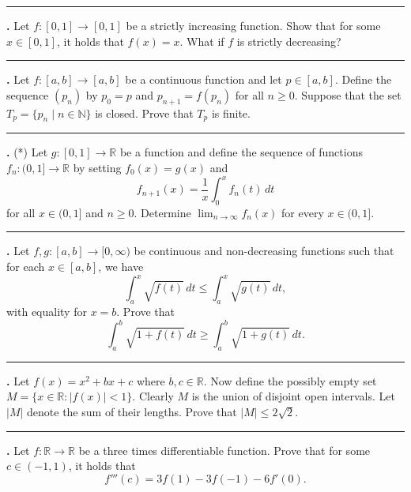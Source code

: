 \documentclass[11pt]{article}
\newcounter{probnum}
\newenvironment{problembox}{\par\noindent\rule{\linewidth}{0.5pt}\vspace{5pt}\par}{\vspace{2pt}}
\begin{document}
\begin{problembox}
\textbf{\theprobnum.} Let $f : [0,1] \to [0,1]$ be a strictly increasing function. Show that for some $x \in [0,1]$, it holds that $f(x) = x$. What if $f$ is strictly decreasing?
\end{problembox}

\begin{problembox}
\textbf{\theprobnum.} Let $f : [a,b] \to [a,b]$ be a continuous function and let $p \in [a,b]$. Define the sequence $(p_n)$ by $p_0 = p$ and $p_{n+1} = f(p_n)$ for all $n \ge 0$. Suppose that the set $T_p = \{p_n \mid n \in \mathbb{N}\}$ is closed. Prove that $T_p$ is finite.
\end{problembox}

\begin{problembox}
\textbf{\theprobnum.} (*) Let $g : [0,1] \to \mathbb{R}$ be a function and define the sequence of functions $f_n : (0,1] \to \mathbb{R}$ by setting $f_0(x) = g(x)$ and
\[
f_{n+1}(x) = \frac{1}{x} \int_0^x f_n(t)\,dt
\]
for all $x \in (0,1]$ and $n \ge 0$. Determine $\lim_{n \to \infty} f_n(x)$ for every $x \in (0,1]$.
\end{problembox}

\begin{problembox}
\textbf{\theprobnum.} Let $f, g : [a,b] \to [0,\infty)$ be continuous and non-decreasing functions such that for each $x \in [a,b]$, we have
\[
\int_a^x \sqrt{f(t)}\,dt \le \int_a^x \sqrt{g(t)}\,dt,
\]
with equality for $x = b$. Prove that
\[
\int_a^b \sqrt{1+f(t)}\,dt \ge \int_a^b \sqrt{1+g(t)}\,dt.
\]
\end{problembox}

\begin{problembox}
\textbf{\theprobnum.} Let $f(x) = x^2 + bx + c$ where $b, c \in \mathbb{R}$. Now define the possibly empty set $M = \{x \in \mathbb{R} : |f(x)| < 1\}$. Clearly $M$ is the union of disjoint open intervals. Let $|M|$ denote the sum of their lengths. Prove that $|M| \le 2\sqrt{2}$.
\end{problembox}

\begin{problembox}
\textbf{\theprobnum.} Let $f : \mathbb{R} \to \mathbb{R}$ be a three times differentiable function. Prove that for some $c \in (-1,1)$, it holds that
\[
f'''(c) = 3f(1) - 3f(-1) - 6f'(0).
\]
\end{problembox}
\end{document}
